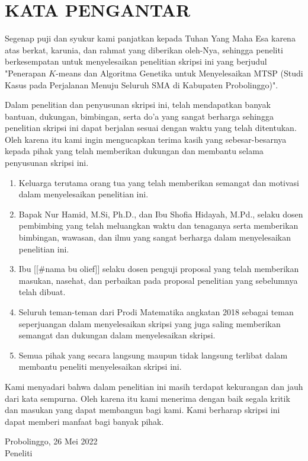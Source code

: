 \newpage
\chapter*{KATA PENGANTAR}

Segenap puji dan syukur kami panjatkan kepada Tuhan Yang Maha Esa karena atas berkat, karunia, dan rahmat yang diberikan oleh-Nya, sehingga peneliti berkesempatan untuk menyelesaikan penelitian skripsi ini yang berjudul "Penerapan $K$-means dan Algoritma Genetika untuk Menyelesaikan MTSP (Studi Kasus pada Perjalanan Menuju Seluruh SMA di Kabupaten Probolinggo)".

Dalam penelitian dan penyusunan skripsi ini, telah mendapatkan banyak bantuan, dukungan, bimbingan, serta do'a yang sangat berharga sehingga penelitian skripsi ini dapat berjalan sesuai dengan waktu yang telah ditentukan.
Oleh karena itu kami ingin mengucapkan terima kasih yang sebesar-besarnya kepada pihak yang telah memberikan dukungan dan membantu selama penyusunan skripsi ini.

\begin{enumerate}
	\item Keluarga terutama orang tua yang telah memberikan semangat dan motivasi dalam menyelesaikan penelitian ini.
	\item Bapak Nur Hamid, M.Si, Ph.D., dan Ibu Shofia Hidayah, M.Pd., selaku dosen pembimbing yang telah meluangkan waktu dan tenaganya serta memberikan bimbingan, wawasan, dan ilmu yang sangat berharga dalam menyelesaikan penelitian ini.
	\item Ibu [[\#nama bu olief]] selaku dosen penguji proposal yang telah memberikan masukan, nasehat, dan perbaikan pada proposal penelitian yang sebelumnya telah dibuat.
	\item Seluruh teman-teman dari Prodi Matematika angkatan 2018 sebagai teman seperjuangan dalam menyelesaikan skripsi yang juga saling memberikan semangat dan dukungan dalam menyelesaikan skripsi.
	\item Semua pihak yang secara langsung maupun tidak langsung terlibat dalam membantu peneliti menyelesaikan skripsi ini.
\end{enumerate}

Kami menyadari bahwa dalam penelitian ini masih terdapat kekurangan dan jauh dari kata sempurna. Oleh karena itu kami menerima dengan baik segala kritik dan masukan yang dapat membangun bagi kami. Kami berharap skripsi ini dapat memberi manfaat bagi banyak pihak.

\begin{flushright}
Probolinggo, 26 Mei 2022\\
Peneliti
\end{flushright}